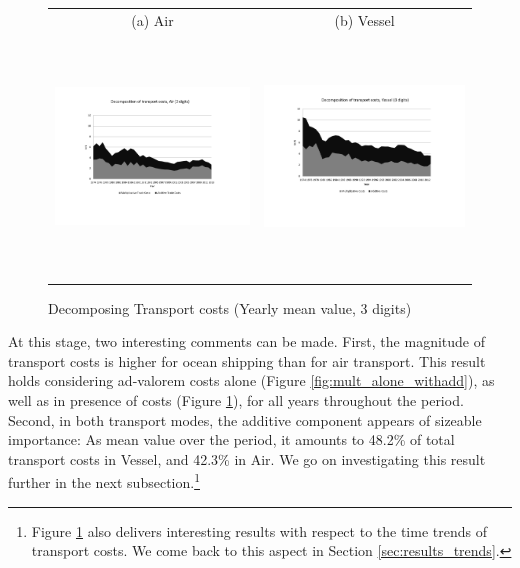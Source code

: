 \documentclass[a4paper,11pt]{article}
\begin{document}
\begin{figure}[htbp]
\caption{Decomposing Transport costs (Yearly mean value, 3 digits)}
\label{fig:decomp_TC_3d}
\begin{center}
\begin{tabular}{cc}
{\small (a) Air } & {\small (b) Vessel}\\
\includegraphics[width=3in, height=2.5in]{Fig2a_decompTC_air_3d.pdf}
& \includegraphics[width=3in,height=2.5in]{Fig2b_decompTC_vessel_3d.pdf} \\
\end{tabular}
\end{center}
\end{figure}

At this stage, two interesting comments can be made. First, the magnitude of transport costs is higher for ocean shipping than for air transport. This result holds considering ad-valorem costs alone (Figure \ref{fig:mult_alone_withadd}), as well as in presence of costs (Figure \ref{fig:decomp_TC_3d}), for all years throughout the period. Second, in both transport modes, the additive component appears of sizeable importance: As mean value over the period, it amounts to 48.2\% of total transport costs in Vessel, and 42.3\% in Air. We go on investigating this result further in the next subsection.\footnote{Figure \ref{fig:decomp_TC_3d} also delivers interesting results with respect to the time trends of transport costs. We come back to this aspect in Section \ref{sec:results_trends}.}
\end{document}
